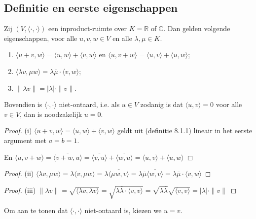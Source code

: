\subsection{Definitie en eerste eigenschappen}

\begin{lemma}[8.1.2]
    Zij $(V, \langle \cdot, \cdot \rangle)$ een inproduct-ruimte over $K = \mathbb{R}$ of $\mathbb{C}$. Dan gelden volgende eigenschappen, voor alle $u, v, w \in V$ en alle $\lambda, \mu \in K$.
    \begin{enumerate}
        \item[(i)] [\emph{bi-additiviteit}] $\langle u + v, w \rangle = \langle u, w \rangle + \langle v, w \rangle$ en $\langle u, v + w \rangle = \langle u, v \rangle + \langle u, w \rangle$;
        \item[(ii)] [\emph{sesqui-lineariteit}] $\langle \lambda v, \mu w \rangle = \lambda \overline{\mu} \cdot \langle v, w \rangle$;
        \item[(iii)] [\emph{homogeniteit van de norm}] $\|\lambda v\| = |\lambda| \cdot \|v\|$.
    \end{enumerate}
    Bovendien is $\langle \cdot, \cdot \rangle$ niet-ontaard, i.e. als $u \in V$ zodanig is dat $\langle u, v \rangle = 0$ voor alle $v \in V$, dan is noodzakelijk $u = 0$.
\end{lemma}
\begin{proof}(i)
    \(\langle u + v, w \rangle = \langle u, w \rangle + \langle v, w \rangle\) geldt uit (definitie 8.1.1) lineair in het eerste argument met \(a=b=1\).

    En 
    \(
        \langle u, v + w \rangle 
        = \overline{\langle v + w, u \rangle} 
        = \overline{\langle v , u \rangle} + \overline{\langle w, u \rangle}
        =\langle u, v \rangle + \langle u, w \rangle
    \)
\end{proof}
\begin{proof}(ii)
    \(
        \langle \lambda v, \mu w \rangle 
        = \lambda \langle  v, \mu w \rangle
        = \lambda \overline{\langle \mu w ,v\rangle}
        = \lambda \overline{\mu} \overline{\langle  w ,v\rangle}
        = \lambda \overline{\mu} \cdot \langle v, w \rangle
    \)
\end{proof}
\begin{proof}(iii)
    \(\|\lambda v\| 
    = \sqrt{\langle \lambda v, \lambda v \rangle} 
    = \sqrt{\lambda \overline{\lambda} \cdot \langle v, v \rangle}
    = \sqrt{\lambda \overline{\lambda}} \sqrt{ \langle v, v \rangle}
    = |\lambda| \cdot \|v\|\)
\end{proof}
Om aan te tonen dat  $\langle \cdot, \cdot \rangle$ niet-ontaard is, kiezen we \(u = v\).

